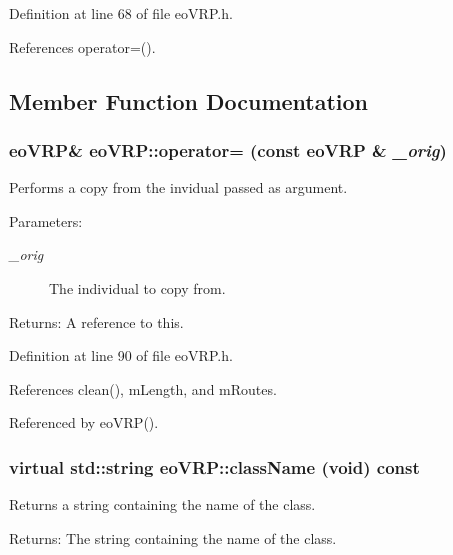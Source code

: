 Definition at line 68 of file eo\-VRP.h.

References operator=().

\subsection{Member Function Documentation}
\subsubsection{\setlength{\rightskip}{0pt plus 5cm}\bf{eo\-VRP}\& eo\-VRP::operator= (const \bf{eo\-VRP} \& {\em \_\-orig})\hspace{0.3cm}{\tt  [inline]}}\label{classeo_v_r_p_c0fcb2c17f849bfa61dd5d7ff072e0e4}


Performs a copy from the invidual passed as argument. 

\begin{Desc}
\item[Parameters:]
\begin{description}
\item[{\em \_\-orig}]The individual to copy from. \end{description}
\end{Desc}
\begin{Desc}
\item[Returns:]A reference to this. \end{Desc}


Definition at line 90 of file eo\-VRP.h.

References clean(), m\-Length, and m\-Routes.

Referenced by eo\-VRP().
\subsubsection{\setlength{\rightskip}{0pt plus 5cm}virtual std::string eo\-VRP::class\-Name (void) const\hspace{0.3cm}{\tt  [inline, virtual]}}\label{classeo_v_r_p_8c7f524cf34787f9ec26ffcc420565c5}


Returns a string containing the name of the class. 

\begin{Desc}
\item[Returns:]The string containing the name of the class. \end{Desc}


